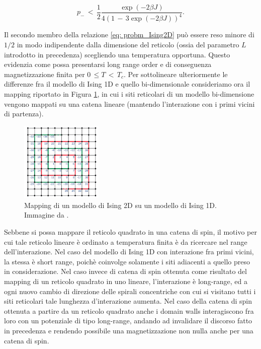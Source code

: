 \begin{equation}
    p_{-}\,<\,\frac{1}{2}\frac{\exp{\left(-2\beta J\right)}}{4 \left(1\,-\,3\exp{\left(-2\beta J\right)}\right)^4}.
    \label{eq: probm_Ising2D}
\end{equation}

Il secondo membro della relazione \eqref{eq: probm_Ising2D} può essere reso minore di $1/2$ in modo indipendente dalla dimensione del reticolo 
(ossia del parametro $L$ introdotto in precedenza) scegliendo una temperatura opportuna. Questo evidenzia come possa 
presentarsi long range order e di conseguenza magnetizzazione finita per $0\,\leq T\,<\,T_c$. Per sottolineare ulteriormente le 
differenze fra il modello di Ising 1D e quello bi-dimensionale consideriamo ora il mapping riportato in Figura \ref{fig: map_2to1_Ising}, 
in cui i siti reticolari di un modello bi-dimensione vengono mappati su una catena lineare (mantendo l'interazione con i primi 
vicini di partenza).

\begin{figure}[H]
    \centering
    \includegraphics[width=0.35\textwidth]{Immagini/map_2to1_Ising.png}
    \caption{Mapping di un modello di Ising 2D su un modello di Ising 1D. Immagine da \cite{galliFSA}.}
    \label{fig: map_2to1_Ising}
\end{figure}

Sebbene si possa mappare il reticolo quadrato in una catena di spin, il motivo per cui tale reticolo lineare è ordinato a temperatura 
finita è da ricercare nel range dell'interazione. Nel caso del modello di Ising 1D con interazione fra primi vicini, la stessa è short 
range, poichè coinvolge solamente i siti adiacenti a quello preso in considerazione. Nel caso invece di catena di spin ottenuta come 
risultato del mapping di un reticolo quadrato in uno lineare, l'interazione è long-range, ed a ogni nuovo cambio di direzione delle 
spirali concentriche con cui si visitano tutti i siti reticolari tale lunghezza d'interazione aumenta. Nel caso della catena di 
spin ottenuta a partire da un reticolo quadrato anche i domain walls interagiscono fra loro con un potenziale di tipo long-range, andando 
ad invalidare il discorso fatto in precedenza e rendendo possibile una magnetizzazione non nulla anche per una catena di spin. 





